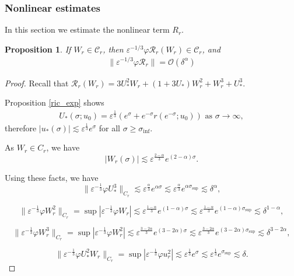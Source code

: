 \documentclass[letterpaper,11pt]{article}
\newcommand{\rmO}{\mathcal{O}}
\newcommand{\eps}{\varepsilon}
\newcommand{\lar}{ \lesssim }
\numberwithin{equation}{section}
\theoremstyle{plain}
\newtheorem{proposition}[theorem]{Proposition}
\begin{document}
\subsubsection{Nonlinear estimates}

In this section we estimate the nonlinear term $R_r$.

\begin{proposition}\label{nl_est}
If $W_r \in \mathcal{C}_{r}$, then $\eps^{-1/3}\varphi \mathcal{R}_r(W_r) \in \mathcal{C}_{r}$, and
\begin{align}
\|\eps^{-1/3}\varphi \mathcal{R}_r \| = \rmO(\delta^{\alpha})
\end{align}
\end{proposition}
\begin{proof}
Recall that $\mathcal{R}_r(W_r) = 3U_*^2W_r+(1+3U_*)W_r^2 +W_r^3 +U_*^3 $.

Proposition \ref{ric_exp} shows
\begin{align*}
U_*(\sigma;u_0) =  \eps^{\frac{1}{3}}(e^\sigma+e^{-\sigma} r(e^{-\sigma}; u_0)   ) \text{ as }\sigma \to \infty,
\end{align*}
therefore $|u_*(\sigma)| \lar \eps^{\frac{1}{3}}e^\sigma$ for all $\sigma \ge \sigma_{\inf}$.

As $W_r \in C_{r}$, we have 
\[
|W_r(\sigma)| \lar \eps^{\frac{2-\alpha}{3}} e^{(2-\alpha)\sigma}.
\]

Using these facts, we have
\[
\|\eps^{-\frac{1}{3}}\varphi U_*^3\|_{C_{r}} \lar \eps^{\frac{\alpha}{3}} e^{\alpha\sigma} \lar \eps^{\frac{\alpha}{3}} e^{\alpha\sigma_{\sup}} \lar \delta^\alpha,
\]

\[
\|\eps^{-\frac{1}{3}}\varphi W_r^2\|_{C_{r}}=\sup |\eps^{-\frac{1}{3}} \varphi W_r| \lar \eps^{\frac{1-\alpha}{3}} e^{(1-\alpha)\sigma} \lar \eps^{\frac{1-\alpha}{3}} e^{(1-\alpha)\sigma_{\sup}} \lar \delta^{1-\alpha},
\]

\[
\|\eps^{-\frac{1}{3}}\varphi W_r^3\|_{C_{r}}=\sup |\eps^{-\frac{1}{3}} \varphi W_r^2| \lar \eps^{\frac{3-2\alpha}{3}} e^{(3-2\alpha)\sigma} \lar \eps^{\frac{3-2\alpha}{3}} e^{(3-2\alpha)\sigma_{\sup}} \lar \delta^{3-2\alpha},
\]

\[
\|\eps^{-\frac{1}{3}}\varphi U_*^2W_r\|_{C_{r}} =\sup |\eps^{-\frac{1}{3}} \varphi u_r^2| \lar \eps^{\frac{1}{3}} e^{\sigma} \lar \eps^{\frac{1}{3}} e^{\sigma_{\sup}} \lar \delta.
\]

\end{proof}
\end{document}
